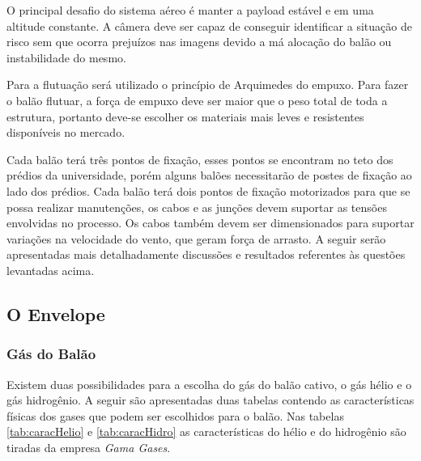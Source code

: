 O principal desafio do sistema aéreo é manter a payload estável e em uma altitude constante. A câmera deve ser capaz de conseguir identificar a situação de risco sem que ocorra prejuízos nas imagens devido a má alocação do balão ou instabilidade do mesmo.

Para a flutuação será utilizado o princípio de Arquimedes do empuxo. Para fazer o balão flutuar, a força de empuxo deve ser maior que o peso total de toda a estrutura, portanto deve-se escolher os materiais mais leves e resistentes disponíveis no mercado.

Cada balão terá três pontos de fixação, esses pontos se encontram no teto dos prédios da universidade, porém alguns balões necessitarão de postes de fixação ao lado dos prédios. Cada balão terá dois pontos de fixação motorizados para que se possa realizar manutenções, os cabos e as junções devem suportar as tensões envolvidas no processo. Os cabos também devem ser dimensionados para suportar variações na velocidade do vento, que geram força de arrasto.
A seguir serão apresentadas mais detalhadamente  discussões e resultados referentes às questões levantadas acima.

\subsection{O Envelope} %
\label{sub:o_envelope}

\subsubsection{Gás do Balão}

	Existem duas possibilidades para a escolha do gás do balão cativo, o gás hélio e o gás hidrogênio. A seguir são apresentadas duas tabelas contendo as características físicas dos gases que podem ser escolhidos para o balão. Nas tabelas \ref{tab:caracHelio} e \ref{tab:caracHidro} as características do hélio e do hidrogênio são tiradas da empresa \textit{Gama Gases}.

